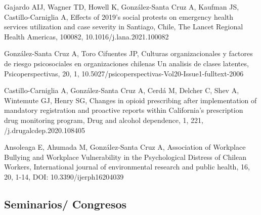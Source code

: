 \documentclass[11pt,a4paper,]{awesome-cv}
\begin{document}
\begin{cventries}
{\begin{cvitems}
\item Gajardo AIJ, Wagner TD, Howell K, González-Santa Cruz A, Kaufman JS, Castillo-Carniglia A, Effects of 2019's social protests on emergency health services utilization and case severity in Santiago, Chile, The Lancet Regional Health Americas, 100082, 10.1016/j.lana.2021.100082
\item González-Santa Cruz A, Toro Cifuentes JP, Culturas organizacionales y factores de riesgo psicosociales en organizaciones chilenas Un analisis de clases latentes, Psicoperspectivas, 20, 1, 10.5027/psicoperspectivas-Vol20-Issue1-fulltext-2006
\item Castillo-Carniglia A, González-Santa Cruz A, Cerdá M, Delcher C, Shev A, Wintemute GJ, Henry SG, Changes in opioid prescribing after implementation of mandatory registration and proactive reports within California's prescription drug monitoring program, Drug and alcohol dependence, 1, 221, /j.drugalcdep.2020.108405
\item Ansoleaga E, Ahumada M, González-Santa Cruz A, Association of Workplace Bullying and Workplace Vulnerability in the Psychological Distress of Chilean Workers, International journal of environmental research and public health, 16, 20, 1-14, DOI: 10.3390/ijerph16204039
\end{cvitems}}
\end{cventries}

\hypertarget{seminarios-congresos}{%
\subsection{Seminarios/ Congresos}\label{seminarios-congresos}}
\end{document}
